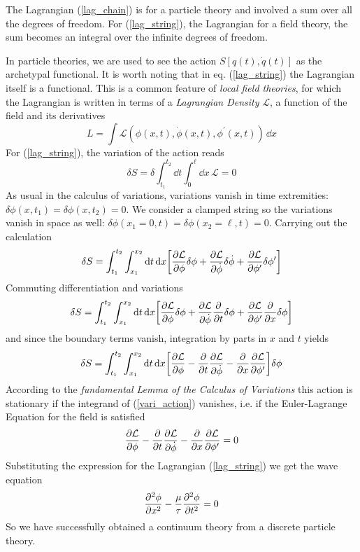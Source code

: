 The Lagrangian (\ref{lag_chain}) is for a particle theory and involved a sum over all the degrees of freedom. For (\ref{lag_string}), the Lagrangian for a field theory, the sum becomes an integral over the infinite degrees of freedom.

In particle theories, we are used to see the action $S[q(t),\dot{q}(t)]$ as the archetypal functional. It is worth noting that in eq. (\ref{lag_string}) the Lagrangian itself is a functional. This is a common feature of \textit{local field theories}, for which the Lagrangian is written in terms of a \textit{Lagrangian Density} $\mathcal{L}$, a function of the field and its derivatives
\begin{equation}
    L=\int \mathcal{L}(\phi(x,t),\dot{\phi}(x,t),\phi^\prime(x,t))\,\dd x
\end{equation}
For (\ref{lag_string}), the variation of the action reads
\begin{equation}
    \delta S = \delta \int_{t_1}^{t_2}\dd t\int_{0}^{\ell}\dd x\, \mathcal{L}=0
\end{equation}
As usual in the calculus of variations, variations vanish in time extremities: $\delta \phi (x,t_1)=\delta \phi(x,t_2)=0$. We consider a clamped string so the variations vanish in space as well: $\delta \phi (x_1=0,t)=\delta \phi(x_2=\ell,t)=0$. Carrying out the calculation
\begin{equation}
    \delta S=\int_{t_1}^{t_2}\int_{x_1}^{x_2}\dd t\,\dd x\qty[\pdv{\mathcal{L}}{\phi}\delta\phi+\pdv{\mathcal{L}}{\dot{\phi}}\delta\dot{\phi}+\pdv{\mathcal{L}}{\phi^\prime}\delta\phi^\prime]
\end{equation}
Commuting differentiation and variations
\begin{equation}
    \delta S=\int_{t_1}^{t_2}\int_{x_1}^{x_2}\dd t\,\dd x\qty[\pdv{\mathcal{L}}{\phi}\delta\phi+\pdv{\mathcal{L}}{\dot{\phi}}\pdv{t}\delta{\phi}+\pdv{\mathcal{L}}{\phi^\prime}\pdv{x}\delta\phi]
\end{equation}
and since the boundary terms vanish, integration by parts in $x$ and $t$ yields
\begin{equation}
    \delta S=\int_{t_1}^{t_2}\int_{x_1}^{x_2}\dd t\,\dd x \qty[\pdv{\mathcal{L}}{ \phi}-\pdv{t}\pdv{\mathcal{L}}{\dot{\phi}}-\pdv{x}\pdv{\mathcal{L}}{\phi^\prime}]\delta\phi
    \label{vari_action}
\end{equation}
According to the \textit{fundamental Lemma of the Calculus of Variations} \cite{lemos2018analytical} this action is stationary if the integrand of (\ref{vari_action}) vanishes, i.e. if the Euler-Lagrange Equation for the field is satisfied
\begin{equation}
    \pdv{\mathcal{L}}{ \phi}-\pdv{t}\pdv{\mathcal{L}}{\dot{\phi}}-\pdv{x}\pdv{\mathcal{L}}{\phi^\prime}=0
\end{equation}
Substituting  the expression for the Lagrangian (\ref{lag_string}) we get the wave equation
\begin{equation}
    \pdv[2]{\phi}{x}-\frac{\mu}{\tau}\pdv[2]{\phi}{t}=0
\end{equation}
So we have successfully obtained a continuum theory from a discrete particle theory.
